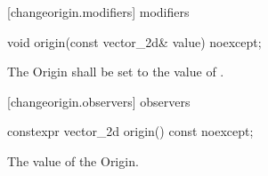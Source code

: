  [changeorigin.modifiers]{ modifiers}

\begin{itemdecl}
void origin(const vector_2d& value) noexcept;
\end{itemdecl}
\begin{itemdescr}
\pnum
\effects
The Origin shall be set to the value of .
\end{itemdescr}

 [changeorigin.observers]{ observers}

\begin{itemdecl}
constexpr vector_2d origin() const noexcept;
\end{itemdecl}
\begin{itemdescr}
\pnum
\returns
The value of the Origin.
\end{itemdescr}
